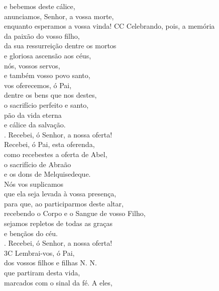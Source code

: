 \documentclass{book}
\begin{document}
\begin{flushleft}
    e bebemos deste cálice, \\
    anunciamos, Senhor, a vossa morte, \\
    enquanto esperamos a vossa vinda!
    \newpage
    {\color{red}CC} Celebrando, pois, a memória \\
    da paixão do vosso filho, \\
    da sua ressurreição dentre os mortos \\
    e gloriosa ascensão aos céus, \\
    nós, vossos servos, \\
    e também vosso povo santo, \\
    vos oferecemos, ó Pai, \\
    dentre os bens que nos destes, \\
    o sacrifício perfeito e santo, \\
    pão da vida eterna \\
    e cálice da salvação.
    \vspace{.1cm} \\
    {\color{red} \Rbar.} Recebei, ó Senhor, a nossa oferta!
    \vspace{.1cm} \\
    Recebei, ó Pai, esta oferenda, \\
    como recebestes a oferta de Abel, \\
    o sacrifício de Abraão \\
    e os dons de Melquisedeque.
    \vspace{.1cm} \\
    Nós vos suplicamos \\
    que ela seja levada à vossa presença, \\
    para que, ao participarmos deste altar, \\
    recebendo o Corpo e o Sangue de vosso Filho, \\
    sejamos repletos de todas as graças \\
    e bençãos do céu.
    \vspace{.1cm} \\
    {\color{red} \Rbar.} Recebei, ó Senhor, a nossa oferta!
    \vspace{.1cm} \\
    {\color{red}3C} Lembrai-vos, ó Pai, \\
    dos vossos filhos e filhas N. N. \\
    que partiram desta vida, \\
    marcados com o sinal da fé.
    A eles, \\

\end{flushleft}
\end{document}

